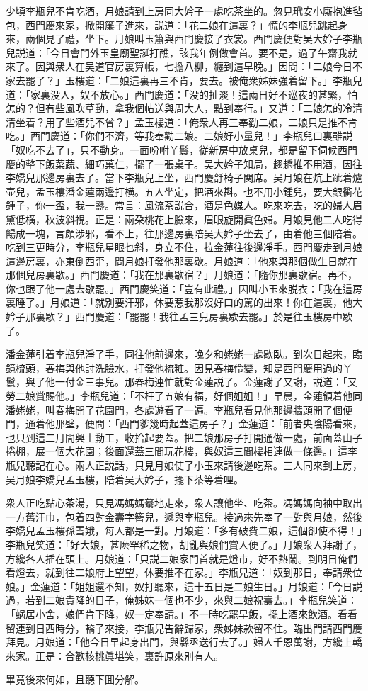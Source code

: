 少頃李瓶兒不肯吃酒，月娘請到上房同大妗子一處吃茶坐的。忽見玳安小廝抱進毡包，西門慶來家，掀開簾子進來，説道：「花二娘在這裏？」慌的李瓶兒跳起身來，兩個見了禮，坐下。月娘叫玉簫與西門慶接了衣裳。西門慶便對吴大妗子李瓶兒説道：「今日會門外玉皇廟聖誕打醮，該我年例做會首。要不是，過了午齋我就來了。因與衆人在吴道官房裏算帳，七擔八柳，纏到這早晚。」因問：「二娘今日不家去罷了？」玉樓道：「二娘這裏再三不肯，要去。被俺衆姊妹強着留下。」李瓶兒道：「家裏没人，奴不放心。」西門慶道：「没的扯淡！這兩日好不巡夜的甚緊，怕怎的？但有些風吹草動，拿我個帖送與周大人，點到奉行。」又道：「二娘怎的冷清清坐着？用了些酒兒不曾？」孟玉樓道：「俺衆人再三奉勸二娘，二娘只是推不肯吃。」西門慶道：「你們不濟，等我奉勸二娘。二娘好小量兒！」李瓶兒口裏雖説「奴吃不去了」，只不動身。一面吩咐丫鬟，従新房中放桌兒，都是留下伺候西門慶的整下飯菜蔬、細巧菓仁，擺了一張桌子。吴大妗子知局，趐趫推不用酒，因往李嬌兒那邊房裏去了。當下李瓶兒上坐，西門慶㧱椅子関席。吴月娘在炕上跐着爐壶兒，孟玉樓潘金蓮兩邊打横。五人坐定，把酒來斟。也不用小鍾兒，要大銀衢花鍾子，你一盃，我一盞。常言：風流茶説合，酒是色媒人。吃來吃去，吃的婦人眉黛低横，秋波斜視。正是：兩朶桃花上臉來，眉眼旋開眞色婦。月娘見他二人吃得餳成一塊，言頗涉邪，看不上，往那邊房裏陪吴大妗子坐去了，由着他三個陪着。吃到三更時分，李瓶兒星眼乜斜，身立不住，拉金蓮往後邊凈手。西門慶走到月娘這邊房裏，亦東倒西歪，問月娘打發他那裏歇。月娘道：「他來與那個做生日就在那個兒房裏歇。」西門慶道：「我在那裏歇宿？」月娘道：「隨你那裏歇宿。再不，你也跟了他一處去歇罷。」西門慶笑道：「豈有此禮。」因叫小玉來脱衣：「我在這房裏睡了。」月娘道：「就別要汗邪，休要惹我那沒好口的駡的出來！你在這裏，他大妗子那裏歇？」西門慶道：「罷罷！我往孟三兒房裏歇去罷。」於是往玉樓房中歇了。

潘金蓮引着李瓶兒淨了手，同往他前邊來，晚夕和姥姥一處歇臥。到次日起來，臨鏡梳頭，春梅與他討洗臉水，打發他梳粧。因見春梅伶變，知是西門慶用過的丫鬟，與了他一付金三事兒。那春梅連忙就對金蓮説了。金蓮謝了又謝，説道：「又勞二娘賞賜他。」李瓶兒道：「不枉了五娘有福，好個姐姐！」早晨，金蓮領着他同潘姥姥，叫春梅開了花園門，各處遊看了一遍。李瓶兒看見他那邊牆頭開了個便門，通着他那壁，便問：「西門爹幾時起蓋這房子？」金蓮道：「前者央陰陽看來，也只到這二月間興土動工，收拾起要蓋。把二娘那房子打開通做一處，前面蓋山子捲棚，展一個大花園；後面還蓋三間玩花樓，與奴這三間樓相連做一條邊。」這李瓶兒聽記在心。兩人正説話，只見月娘使了小玉來請後邊吃茶。三人同來到上房，吴月娘李嬌兒孟玉樓，陪着吴大妗子，擺下茶等着哩。

衆人正吃點心茶湯，只見馮媽媽驀地走來，衆人讓他坐、吃茶。馮媽媽向袖中取出一方舊汗巾，包着四對金壽字簪兒，遞與李瓶兒。接過來先奉了一對與月娘，然後李嬌兒孟玉樓孫雪娥，每人都是一對。月娘道：「多有破費二娘，這個卻使不得！」李瓶兒笑道：「好大娘，甚麽罕稀之物，胡亂與娘們賞人便了。」月娘衆人拜謝了，方纔各人插在頭上。月娘道：「只説二娘家門首就是燈市，好不熱鬧。到明日俺們看燈去，就到往二娘府上望望，休要推不在家。」李瓶兒道：「奴到那日，奉請衆位娘。」金蓮道：「姐姐還不知，奴打聽來，這十五日是二娘生日。」月娘道：「今日説過，若到二娘貴降的日子，俺姊妹一個也不少，來與二娘祝壽去。」李瓶兒笑道：「蜗居小舍，娘們肯下降，奴一定奉請。」不一時吃罷早飯，擺上酒來飲酒。看看留連到日西時分，轎子來接，李瓶兒告辭歸家，衆姊妹款留不住。臨出門請西門慶拜見。月娘道：「他今日早起身出門，與縣丞送行去了。」婦人千恩萬謝，方纔上轎來家。正是：合歡核桃眞堪笑，裏許原來別有人。

畢竟後來何如，且聽下囬分解。

